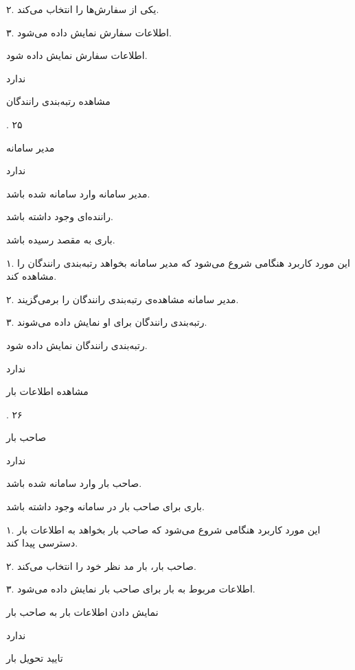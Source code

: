 ۲. یکی از سفارش‌ها را انتخاب می‌کند.

۳. اطلاعات سفارش نمایش داده می‌شود.

اطلاعات سفارش نمایش داده شود.

ندارد

\newpage

مشاهده رتبه‌بندی رانندگان

.
۲۵

مدیر سامانه

ندارد


مدیر سامانه وارد سامانه شده باشد.

راننده‌ای وجود داشته باشد.

باری به مقصد رسیده باشد.


۱. این مورد کاربرد هنگامی شروع می‌شود که مدیر سامانه بخواهد رتبه‌بندی رانندگان را مشاهده کند.

۲. مدیر سامانه مشاهده‌ی رتبه‌بندی رانندگان را برمی‌گزیند.

۳. رتبه‌بندی رانندگان برای او نمایش داده می‌شوند.

رتبه‌بندی رانندگان نمایش داده شود.

ندارد

\newpage

مشاهده اطلاعات بار

.
۲۶

صاحب بار

ندارد


صاحب بار وارد سامانه شده باشد.

باری برای صاحب بار در سامانه وجود داشته باشد.


۱. این مورد کاربرد هنگامی شروع می‌شود که صاحب بار بخواهد به اطلاعات بار دسترسی پیدا کند.

۲. صاحب بار، بار مد نظر خود را انتخاب می‌کند. 

۳. اطلاعات مربوط به بار برای صاحب بار نمایش داده می‌شود.

نمایش دادن اطلاعات بار به صاحب بار

ندارد

\newpage

تایید تحویل بار

